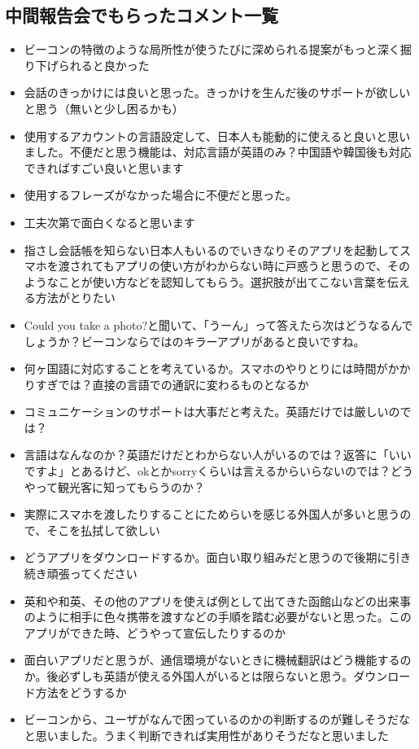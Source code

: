 \documentclass[openany,11pt,papersize]{jsbook}
\begin{document}
\begin{appendix}
\chapter{中間報告会でもらったコメント一覧}
\begin{itemize}
 \item ビーコンの特徴のような局所性が使うたびに深められる提案がもっと深く掘り下げられると良かった
 \item 会話のきっかけには良いと思った。きっかけを生んだ後のサポートが欲しいと思う（無いと少し困るかも）
 \item 使用するアカウントの言語設定して、日本人も能動的に使えると良いと思いました。不便だと思う機能は、対応言語が英語のみ？中国語や韓国後も対応できればすごい良いと思います
 \item 使用するフレーズがなかった場合に不便だと思った。
 \item 工夫次第で面白くなると思います
 \item 指さし会話帳を知らない日本人もいるのでいきなりそのアプリを起動してスマホを渡されてもアプリの使い方がわからない時に戸惑うと思うので、そのようなことが使い方などを認知してもらう。選択肢が出てこない言葉を伝える方法がとりたい
 \item Could you take a photo?と聞いて、「うーん」って答えたら次はどうなるんでしょうか？ビーコンならではのキラーアプリがあると良いですね。
 \item 何ヶ国語に対応することを考えているか。スマホのやりとりには時間がかかりすぎでは？直接の言語での通訳に変わるものとなるか
 \item コミュニケーションのサポートは大事だと考えた。英語だけでは厳しいのでは？
 \item 言語はなんなのか？英語だけだとわからない人がいるのでは？返答に「いいですよ」とあるけど、okとかsorryくらいは言えるからいらないのでは？どうやって観光客に知ってもらうのか？
 \item 実際にスマホを渡したりすることにためらいを感じる外国人が多いと思うので、そこを払拭して欲しい
 \item どうアプリをダウンロードするか。面白い取り組みだと思うので後期に引き続き頑張ってください
 \item 英和や和英、その他のアプリを使えば例として出てきた函館山などの出来事のように相手に色々携帯を渡すなどの手順を踏む必要がないと思った。このアプリができた時、どうやって宣伝したりするのか
 \item 面白いアプリだと思うが、通信環境がないときに機械翻訳はどう機能するのか。後必ずしも英語が使える外国人がいるとは限らないと思う。ダウンロード方法をどうするか
 \item ビーコンから、ユーザがなんで困っているのかの判断するのが難しそうだなと思いました。うまく判断できれば実用性がありそうだなと思いました

\end{itemize}
\end{appendix}
\end{document}
